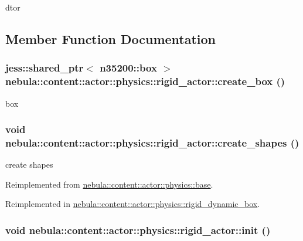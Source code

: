 dtor 

\subsection{Member Function Documentation}
\hypertarget{classnebula_1_1content_1_1actor_1_1physics_1_1rigid__actor_a46198d7aa70fd4ef5410e3643104c1e2}{
\subsubsection[{create\_\-box}]{\setlength{\rightskip}{0pt plus 5cm}jess::shared\_\-ptr$<$ {\bf n35200::box} $>$ nebula::content::actor::physics::rigid\_\-actor::create\_\-box ()}}
\label{classnebula_1_1content_1_1actor_1_1physics_1_1rigid__actor_a46198d7aa70fd4ef5410e3643104c1e2}


box \hypertarget{classnebula_1_1content_1_1actor_1_1physics_1_1rigid__actor_a5ada308047050540ae655a7fe7ff8a3e}{
\subsubsection[{create\_\-shapes}]{\setlength{\rightskip}{0pt plus 5cm}void nebula::content::actor::physics::rigid\_\-actor::create\_\-shapes ()}}
\label{classnebula_1_1content_1_1actor_1_1physics_1_1rigid__actor_a5ada308047050540ae655a7fe7ff8a3e}


create shapes 

Reimplemented from \hyperlink{classnebula_1_1content_1_1actor_1_1physics_1_1base_acb8de05018a4ca6927706627d9f7c48c}{nebula::content::actor::physics::base}.

Reimplemented in \hyperlink{classnebula_1_1content_1_1actor_1_1physics_1_1rigid__dynamic__box_a77dc2beadcdfda10eeb5ef1abed6ee5e}{nebula::content::actor::physics::rigid\_\-dynamic\_\-box}.\hypertarget{classnebula_1_1content_1_1actor_1_1physics_1_1rigid__actor_a9c4d9fe73271ad35a646c95fc12b4cde}{
\subsubsection[{init}]{\setlength{\rightskip}{0pt plus 5cm}void nebula::content::actor::physics::rigid\_\-actor::init ()}}
\label{classnebula_1_1content_1_1actor_1_1physics_1_1rigid__actor_a9c4d9fe73271ad35a646c95fc12b4cde}


